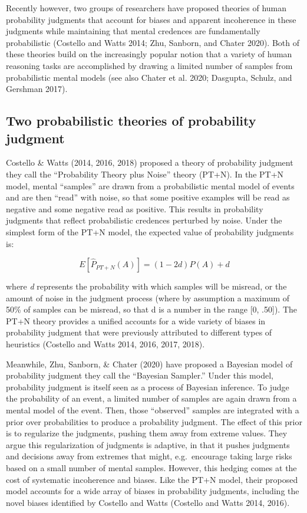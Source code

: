 \documentclass{article}
\begin{document}
Recently however, two groups of researchers have proposed theories of
human probability judgments that account for biases and apparent
incoherence in these judgments while maintaining that mental credences
are fundamentally probabilistic (Costello and Watts 2014; Zhu, Sanborn,
and Chater 2020). Both of these theories build on the increasingly
popular notion that a variety of human reasoning tasks are accomplished
by drawing a limited number of samples from probabilistic mental models
(see also Chater et al. 2020; Dasgupta, Schulz, and Gershman 2017).

\hypertarget{two-probabilistic-theories-of-probability-judgment}{%
\subsection{Two probabilistic theories of probability
judgment}\label{two-probabilistic-theories-of-probability-judgment}}

Costello \& Watts (2014, 2016, 2018) proposed a theory of probability
judgment they call the ``Probability Theory plus Noise'' theory (PT+N).
In the PT+N model, mental ``samples'' are drawn from a probabilistic
mental model of events and are then ``read'' with noise, so that some
positive examples will be read as negative and some negative read as
positive. This results in probability judgments that reflect
probabilistic credences perturbed by noise. Under the simplest form of
the PT+N model, the expected value of probability judgments is:

\[E[\hat{P}_{PT+N}(A)] = (1-2d)P(A) + d \]

where \emph{d} represents the probability with which samples will be
misread, or the amount of noise in the judgment process (where by
assumption a maximum of 50\% of samples can be misread, so that d is a
number in the range {[}0, .50{]}). The PT+N theory provides a unified
accounts for a wide variety of biases in probability judgment that were
previously attributed to different types of heuristics (Costello and
Watts 2014, 2016, 2017, 2018).

Meanwhile, Zhu, Sanborn, \& Chater (2020) have proposed a Bayesian model
of probability judgment they call the ``Bayesian Sampler.'' Under this
model, probability judgment is itself seen as a process of Bayesian
inference. To judge the probability of an event, a limited number of
samples are again drawn from a mental model of the event. Then, those
``observed'' samples are integrated with a prior over probabilities to
produce a probability judgment. The effect of this prior is to
regularize the judgments, pushing them away from extreme values. They
argue this regularization of judgments is adaptive, in that it pushes
judgments and decisions away from extremes that might, e.g.~encourage
taking large risks based on a small number of mental samples. However,
this hedging comes at the cost of systematic incoherence and biases.
Like the PT+N model, their proposed model accounts for a wide array of
biases in probability judgments, including the novel biases identified
by Costello and Watts (Costello and Watts 2014, 2016).
\end{document}
